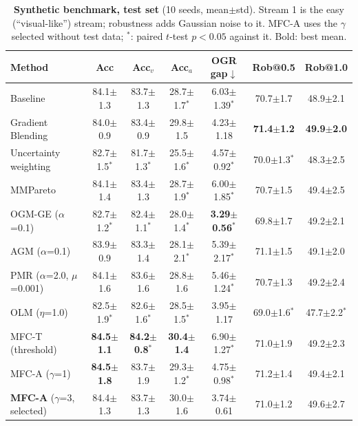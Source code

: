 \documentclass[fleqn,10pt]{wlscirep}
\newcommand{\pmm}{$\pm$}
\begin{document}
\begin{table}[t]
\caption{\textbf{Synthetic benchmark, test set} (10 seeds, mean\pmm std). Stream 1 is the easy (``visual-like'') stream; robustness adds Gaussian noise to it. MFC-A uses the $\gamma$ selected without test data; $^{*}$: paired $t$-test $p<0.05$ against it. Bold: best mean.}
\label{tab:main_syn}
\centering
\footnotesize
\begin{tabular}{@{}lcccccc@{}}
\toprule
\textbf{Method} & \textbf{Acc} & \textbf{Acc$_v$} & \textbf{Acc$_a$} & \textbf{OGR gap}$\downarrow$ & \textbf{Rob@0.5} & \textbf{Rob@1.0} \\ \midrule
Baseline & 84.1$\pm$1.3 & 83.7$\pm$1.3 & 28.7$\pm$1.7$^{*}$ & 6.03$\pm$1.39$^{*}$ & 70.7$\pm$1.7 & 48.9$\pm$2.1 \\
Gradient Blending & 84.0$\pm$0.9 & 83.4$\pm$0.9 & 29.8$\pm$1.5 & 4.23$\pm$1.18 & \textbf{71.4$\pm$1.2} & \textbf{49.9$\pm$2.0} \\
Uncertainty weighting & 82.7$\pm$1.5$^{*}$ & 81.7$\pm$1.3$^{*}$ & 25.5$\pm$1.6$^{*}$ & 4.57$\pm$0.92$^{*}$ & 70.0$\pm$1.3$^{*}$ & 48.3$\pm$2.5 \\
MMPareto & 84.1$\pm$1.4 & 83.4$\pm$1.3 & 28.7$\pm$1.9$^{*}$ & 6.00$\pm$1.85$^{*}$ & 70.7$\pm$1.5 & 49.4$\pm$2.5 \\
OGM-GE ($\alpha$=0.1) & 82.7$\pm$1.2$^{*}$ & 82.4$\pm$1.1$^{*}$ & 28.0$\pm$1.4$^{*}$ & \textbf{3.29$\pm$0.56$^{*}$} & 69.8$\pm$1.7 & 49.2$\pm$2.1 \\
AGM ($\alpha$=0.1) & 83.9$\pm$0.9 & 83.3$\pm$1.4 & 28.1$\pm$2.1$^{*}$ & 5.39$\pm$2.17$^{*}$ & 71.1$\pm$1.5 & 49.1$\pm$2.0 \\
PMR ($\alpha$=2.0, $\mu$=0.001) & 84.1$\pm$1.6 & 83.6$\pm$1.6 & 28.8$\pm$1.6 & 5.46$\pm$1.24$^{*}$ & 70.7$\pm$1.3 & 49.2$\pm$2.4 \\
OLM ($\eta$=1.0) & 82.5$\pm$1.9$^{*}$ & 82.6$\pm$1.6$^{*}$ & 28.5$\pm$1.5$^{*}$ & 3.95$\pm$1.17 & 69.0$\pm$1.6$^{*}$ & 47.7$\pm$2.2$^{*}$ \\
MFC-T (threshold) & \textbf{84.5$\pm$1.1} & \textbf{84.2$\pm$0.8$^{*}$} & \textbf{30.4$\pm$1.4} & 6.90$\pm$1.27$^{*}$ & 71.0$\pm$1.9 & 49.2$\pm$2.3 \\
MFC-A ($\gamma$=1) & \textbf{84.5$\pm$1.8} & 83.7$\pm$1.9 & 29.3$\pm$1.2$^{*}$ & 4.75$\pm$0.98$^{*}$ & 71.2$\pm$1.4 & 49.4$\pm$2.1 \\
\textbf{MFC-A} ($\gamma$=3, selected) & 84.4$\pm$1.3 & 83.7$\pm$1.3 & 30.0$\pm$1.6 & 3.74$\pm$0.61 & 71.0$\pm$1.2 & 49.6$\pm$2.7 \\
\bottomrule
\end{tabular}
\end{table}
\end{document}
